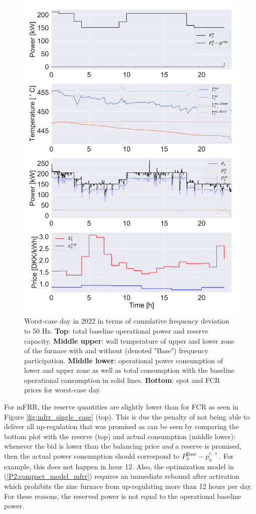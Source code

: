 \documentclass[lettersize,journal]{IEEEtran}
\begin{document}
\begin{figure}[!t]
    \centering
    \includegraphics[width=\columnwidth]{figures/fcr_single_case.png}
    \caption{Worst-case day in 2022 in terms of cumulative frequency deviation to 50 Hz. \textbf{Top}: total baseline operational power and reserve capacity. \textbf{Middle upper}: wall temperature of upper and lower zone of the furnace with and without (denoted "Base") frequency participation. \textbf{Middle lower}: operational power consumption of lower and upper zone as well as total consumption with the baseline operational consumption in solid lines. \textbf{Bottom}: spot and FCR prices for worst-case day.}
    \label{fig:fcr_single_case}
\end{figure}

For mFRR, the reserve quantities are slightly lower than for FCR as seen in Figure \ref{fig:mfrr_single_case} (top). This is due the penalty of not being able to deliver all up-regulation that was promised as can be seen by comparing the bottom plot with the reserve (top) and actual consumption (middle lower): whenever the bid is lower than the balancing price \textit{and} a reserve is promised, then the actual power consumption should correspond to $P^{\text{Base}}_{h} - p_{h}^{r, \uparrow}$. For example, this does not happen in hour 12. Also, the optimization model in (\ref{P2:compact_model_mfrr}) requires an immediate rebound after activation which prohibits the zinc furnace from up-regulating more than 12 hours per day. For these reasons, the reserved power is not equal to the operational baseline power.
\end{document}
